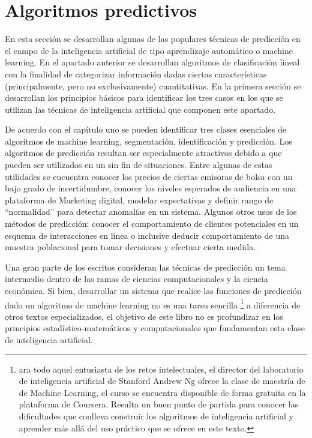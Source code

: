 \documentclass[letterpaper,12pt, spanish, oneside]{book} %
\let\oldfootnote\footnote
\renewcommand{\footnote}[1]{%
  \begingroup%
  \linespread{1.2}%
  \oldfootnote{#1}%
  \endgroup%
}
\begin{document}
\chapter{Algoritmos predictivos}

En esta sección se desarrollan algunas de las populares técnicas de predicción en el campo de la inteligencia artificial de tipo aprendizaje automático o machine learning. En el apartado anterior se desarrollan algoritmos de clasificación lineal con la finalidad de categorizar información dadas ciertas características (principalmente, pero no exclusivamente) cuantitativas. En la primera sección se desarrollan los principios básicos para identificar los tres casos en los que se utilizan las técnicas de inteligencia artificial que componen este apartado.

De acuerdo con el capítulo uno se pueden identificar tres clases esenciales de algoritmos de machine learning, segmentación, identificación y predicción. Los algoritmos de predicción resultan ser especialmente atractivos debido a que pueden ser utilizados en un sin fin de situaciones. Entre algunas de estas utilidades se encuentra conocer los precios de ciertas emisoras de bolsa con un bajo grado de incertidumbre, conocer los niveles esperados de audiencia en una plataforma de Marketing digital, modelar expectativas y definir rango de “normalidad” para detectar anomalías en un sistema. Algunos otros usos de los métodos de predicción: conocer el comportamiento de clientes potenciales en un esquema de interacciones en línea o inclusive deducir comportamiento de una muestra poblacional para tomar decisiones y efectuar cierta medida.

Una gran parte de los escritos consideran las técnicas de predicción un tema intermedio dentro de las ramas de ciencias computacionales y la ciencia económica. Si bien, desarrollar un sistema que realice las funciones de predicción dado un algoritmo de machine learning no es una tarea sencilla\footnote{ara todo aquel entusiasta de los retos intelectuales, el director del laboratorio de inteligencia artificial de Stanford Andrew Ng ofrece la clase de maestría de de Machine Learning, el curso se encuentra disponible de forma gratuita en la plataforma de Coursera. Resulta un buen punto de partida para conocer las dificultades que conlleva construir los algoritmos de inteligencia artificial y aprender más allá del uso práctico que se ofrece en este texto.} a diferencia de otros textos especializados, el objetivo de este libro no es profundizar en los principios estadístico-matemáticos y computacionales que fundamentan esta clase de inteligencia artificial. 
\end{document}
